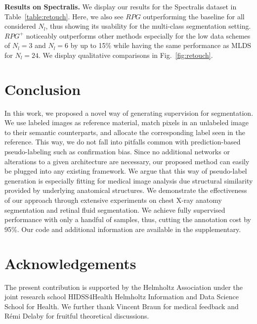 \documentclass[letterpaper]{article} %
\begin{document}
\noindent\textbf{Results on Spectralis.}
We display our results for the Spectralis dataset in Table~\ref{table:retouch}. Here, we also see $RPG$ outperforming the baseline for all considered $N_l$, thus showing its usability for the multi-class segmentation setting. $RPG^+$ noticeably outperforms other methods especially for the low data schemes of $N_l=3$ and $N_l=6$ by up to 15\% while having the same performance as MLDS for $N_l=24$. We display qualitative comparisons in Fig.~\ref{fig:retouch}.


\section{Conclusion}
In this work, we proposed a novel way of generating supervision for segmentation. We use labeled images as reference material, match pixels in an unlabeled image to their semantic counterparts, and allocate the corresponding label seen in the reference. This way, we do not fall into pitfalls common with prediction-based pseudo-labeling such as confirmation bias.  Since no additional networks or alterations to a given architecture are necessary, our proposed method can easily be plugged into any existing framework. We argue that this way of pseudo-label generation is especially fitting for medical image analysis due structural similarity provided by underlying anatomical structures. We demonstrate the effectiveness of our approach through extensive experiments on chest X-ray anatomy segmentation and retinal fluid segmentation. We achieve fully supervised performance with only a handful of samples, thus, cutting the annotation cost by 95\%. Our code and additional information are available in the supplementary.

\section{Acknowledgements}
The present contribution is supported by the Helmholtz Association under the joint research school HIDSS4Health  Helmholtz Information and Data Science School for Health. We further thank Vincent Braun for medical feedback and R\'emi Delaby for fruitful theoretical discussions.


\end{document}
